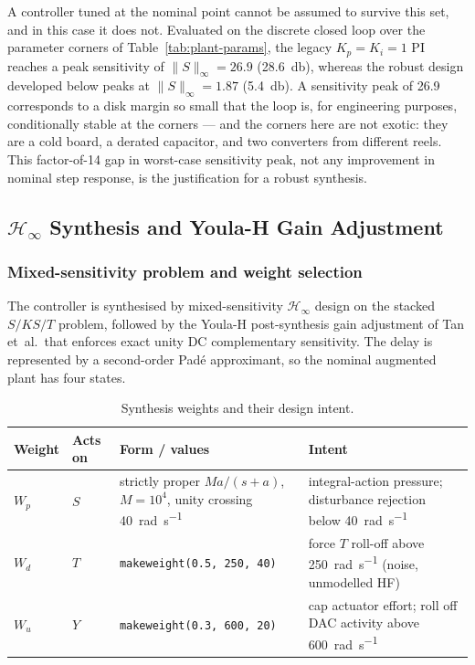 A controller tuned at the nominal point cannot be assumed to survive this set, and in
this case it does not. Evaluated on the discrete closed loop over the parameter corners
of Table~\ref{tab:plant-params}, the legacy $K_p=K_i=1$ PI reaches a peak sensitivity of
$\|S\|_\infty = \num{26.9}$ (\SI{28.6}{\decibel}), whereas the robust design developed
below peaks at $\|S\|_\infty = \num{1.87}$ (\SI{5.4}{\decibel}).
A sensitivity peak of \num{26.9} corresponds to a disk margin so small that the loop is,
for engineering purposes, conditionally stable at the corners --- and the corners here
are not exotic: they are a cold board, a derated capacitor, and two converters from
different reels. This factor-of-\num{14} gap in worst-case sensitivity peak, not any
improvement in nominal step response, is the justification for a robust synthesis.

\subsection{\texorpdfstring{$\mathcal{H}_\infty$}{H-infinity} Synthesis and Youla-H Gain Adjustment}
\label{sec:synthesis}

\subsubsection{Mixed-sensitivity problem and weight selection}

The controller is synthesised by mixed-sensitivity $\mathcal{H}_\infty$ design on the
stacked $S/KS/T$ problem, followed by the Youla-H post-synthesis gain adjustment of
Tan et~al.\ that enforces exact unity DC complementary sensitivity.
The delay is represented by a second-order Pad\'e approximant, so the nominal augmented
plant has four states.

\begin{table}[H]
\caption{Synthesis weights and their design intent.}
\label{tab:weights}
\begin{tabular}{llll}
\toprule
\textbf{Weight} & \textbf{Acts on} & \textbf{Form / values} & \textbf{Intent}\\
\midrule
$W_p$ & $S$ & strictly proper $Ma/(s+a)$, $M=10^4$, unity crossing \SI{40}{\radian\per\second} & integral-action pressure; disturbance rejection below \SI{40}{\radian\per\second}\\
$W_d$ & $T$ & \texttt{makeweight(0.5, 250, 40)} & force $T$ roll-off above \SI{250}{\radian\per\second} (noise, unmodelled HF)\\
$W_u$ & $Y$ & \texttt{makeweight(0.3, 600, 20)} & cap actuator effort; roll off DAC activity above \SI{600}{\radian\per\second}\\
\bottomrule
\end{tabular}
\end{table}

